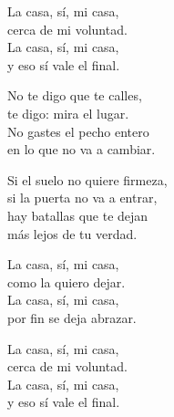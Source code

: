 \begin{lyrics}
La casa, sí, mi casa,\\
cerca de mi voluntad.\\
La casa, sí, mi casa,\\
y eso sí vale el final.

No te digo que te calles,\\
te digo: mira el lugar.\\
No gastes el pecho entero\\
en lo que no va a cambiar.

Si el suelo no quiere firmeza,\\
si la puerta no va a entrar,\\
hay batallas que te dejan\\
más lejos de tu verdad.

La casa, sí, mi casa,\\
como la quiero dejar.\\
La casa, sí, mi casa,\\
por fin se deja abrazar.

La casa, sí, mi casa,\\
cerca de mi voluntad.\\
La casa, sí, mi casa,\\
y eso sí vale el final.

\end{lyrics}

